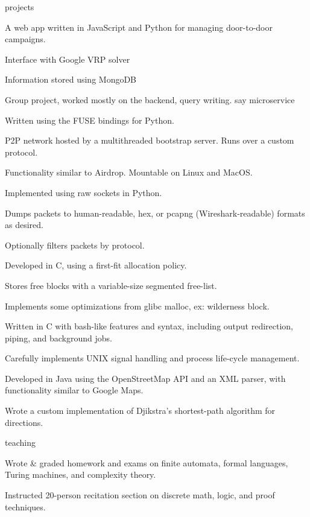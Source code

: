 \documentclass{cv}
\begin{document}
\begin{cvsection}{projects}
  {
    \item A web app written in JavaScript and Python for managing door-to-door campaigns. 
    \item Interface with Google VRP solver
    \item Information stored using MongoDB
    \item Group project, worked mostly on the backend, query writing. say microservice
  }
  {
    \item Written using the FUSE bindings for Python. 
    \item P2P network hosted by a multithreaded bootstrap server. Runs over a custom protocol.
    \item Functionality similar to Airdrop. Mountable on Linux and MacOS.
  }
  {
    \item Implemented using raw sockets in Python. 
    \item Dumps packets to human-readable, hex, or pcapng (Wireshark-readable) formats as desired. 
    \item Optionally filters packets by protocol.
  }
  {
    \item Developed in C, using a first-fit allocation policy.
    \item Stores free blocks with a variable-size segmented free-list.
    \item Implements some optimizations from glibc malloc, ex: wilderness block.
  }
  {
    \item Written in C with bash-like features and syntax, including output redirection, piping, and background jobs. 
    \item Carefully implements UNIX signal handling and process life-cycle management.
  }
  {
    \item Developed in Java using the OpenStreetMap API and an XML parser, with functionality similar to Google Maps.
    \item Wrote a custom implementation of Djikstra's shortest-path algorithm for directions.
  }
\end{cvsection}

\begin{cvsection}{teaching}
  {
    \item Wrote \& graded homework and exams on finite automata, formal languages, Turing machines, and complexity theory.
  }
  {
    \item Instructed 20-person recitation section on discrete math, logic, and proof techniques.
  }
\end{cvsection}
\end{document}
